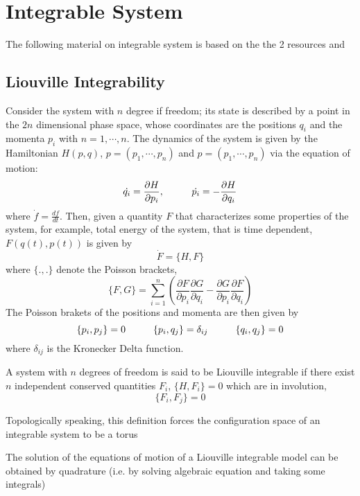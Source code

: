 \section{Integrable System}

The following material on integrable system is based on the the 2 resources \cite{Suntherland}  and \cite{Serban}
\subsection{Liouville Integrability}
Consider the system with $n$ degree if freedom; its state is described by a point in the $2n$ dimensional phase space, whose coordinates are the positions $q_i$ and the momenta $p_i$ with $n=1,\cdots, n$. The dynamics of the system is given by the Hamiltonian $H(p,q)$, $p=(p_1, \cdots,p_n)$ and $p=(p_1, \cdots, p_n)$ via the equation of motion: 
\begin{equation}
	\dot{q_i}=\frac{\partial H}{\partial p_i}, \hskip 1cm \dot{p_i}=-\frac{\partial H}{\partial q_i}
\end{equation}
where $\dot f=\frac{df}{dt}$. Then, given a quantity $F$ that characterizes some properties of the system, for example, total energy of the system, that is time dependent, $F(q(t),p(t))$ is given by
\begin{equation}
	\dot{F}=\{H,F\}
\end{equation}
where $\{.,.\}$ denote the Poisson brackets,
\begin{equation}
	\{F,G\}=\sum_{i=1}^{n}\left(\frac{\partial F}{\partial p_i}\frac{\partial G}{\partial q_i}-\frac{\partial G}{\partial p_i}\frac{\partial F}{\partial q_i}\right)
\end{equation}
The Poisson brakets of the positions and momenta are then given by
\begin{equation}
	\{p_i,p_j\}=0 \hskip1cm \{p_i,q_j\}=\delta_{ij} \hskip1cm \{q_i,q_j\}=0
\end{equation}
where $\delta_{ij}$ is the Kronecker Delta function. 
\begin{definition}
	A system with $n$ degrees of freedom is said to be Liouville integrable if there exist $n$ independent conserved quantities $F_i$, $\{H,F_i\}=0$ which are in involution, 
	\begin{equation}
		\{F_i,F_j\}=0
	\end{equation}
\end{definition}
Topologically speaking, this definition forces the configuration space of an integrable system to be a torus
\begin{theorem}
	The solution of the equations of motion of a Liouville integrable model can be obtained by quadrature (i.e. by solving algebraic equation and taking some integrals)
\end{theorem}